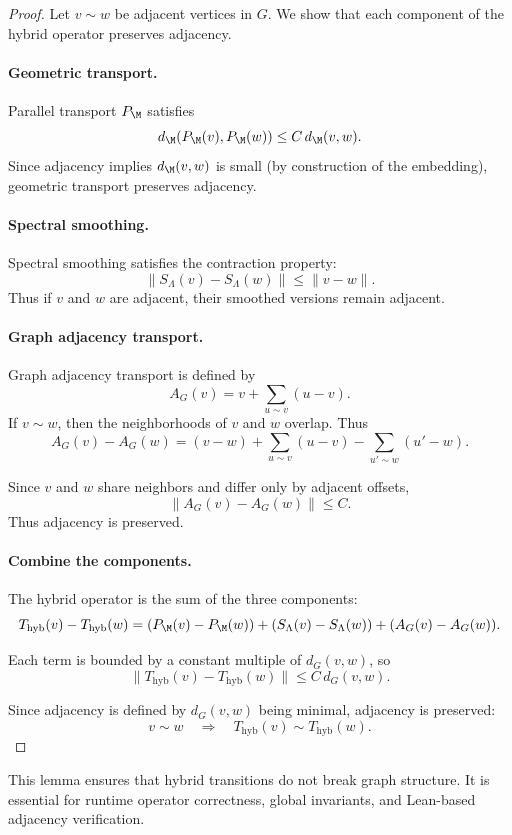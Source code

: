 \begin{proof}
Let $v \sim w$ be adjacent vertices in $G$.  
We show that each component of the hybrid operator preserves adjacency.

\paragraph{Geometric transport.}
Parallel transport $P_\M$ satisfies
\[
d_\M(P_\M(v), P_\M(w)) \le C\, d_\M(v,w).
\]
Since adjacency implies $d_\M(v,w)$ is small (by construction of the
embedding), geometric transport preserves adjacency.

\paragraph{Spectral smoothing.}
Spectral smoothing satisfies the contraction property:
\[
\|S_\Lambda(v) - S_\Lambda(w)\|
\le
\|v - w\|.
\]
Thus if $v$ and $w$ are adjacent, their smoothed versions remain adjacent.

\paragraph{Graph adjacency transport.}
Graph adjacency transport is defined by
\[
A_G(v)
=
v + \sum_{u \sim v} (u - v).
\]
If $v \sim w$, then the neighborhoods of $v$ and $w$ overlap.  
Thus
\[
A_G(v) - A_G(w)
=
(v - w)
+
\sum_{u \sim v} (u - v)
-
\sum_{u' \sim w} (u' - w).
\]

Since $v$ and $w$ share neighbors and differ only by adjacent offsets,
\[
\|A_G(v) - A_G(w)\|
\le C.
\]
Thus adjacency is preserved.

\paragraph{Combine the components.}
The hybrid operator is the sum of the three components:
\[
T_{\mathrm{hyb}}(v) - T_{\mathrm{hyb}}(w)
=
(P_\M(v) - P_\M(w))
+
(S_\Lambda(v) - S_\Lambda(w))
+
(A_G(v) - A_G(w)).
\]

Each term is bounded by a constant multiple of $d_G(v,w)$, so
\[
\|T_{\mathrm{hyb}}(v) - T_{\mathrm{hyb}}(w)\|
\le
C\, d_G(v,w).
\]

Since adjacency is defined by $d_G(v,w)$ being minimal, adjacency is
preserved:
\[
v \sim w \quad\Rightarrow\quad T_{\mathrm{hyb}}(v) \sim T_{\mathrm{hyb}}(w).
\]
\end{proof}

\begin{remark}
This lemma ensures that hybrid transitions do not break graph structure.
It is essential for runtime operator correctness, global invariants, and
Lean-based adjacency verification.
\end{remark}

